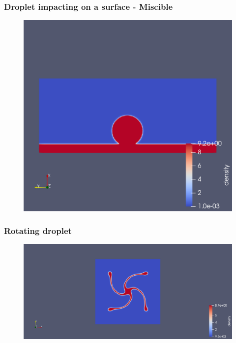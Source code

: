 \documentclass{beamer}
\begin{document}
		\begin{frame}
			\frametitle{Droplet impacting on a surface - Miscible}
			\begin{figure}
				\includegraphics[scale=0.4]{pics/impactingDropletMCMP.pdf}
			\end{figure}
		\end{frame}
		
		\begin{frame}
			\frametitle{Rotating droplet}
			\begin{figure}
				\includegraphics[scale=0.3]{pics/rotatingDroplet.pdf}
			\end{figure}
		\end{frame}
		
\end{document}
